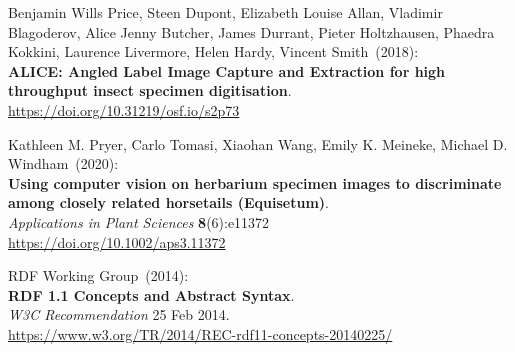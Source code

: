 \begin{thebibliography}{9}
Benjamin Wills Price, Steen Dupont, Elizabeth Louise Allan, Vladimir Blagoderov, Alice Jenny Butcher, James Durrant, Pieter Holtzhausen, Phaedra Kokkini, Laurence Livermore, Helen Hardy, Vincent Smith~(2018):\\
\textbf{ALICE: Angled Label Image Capture and Extraction
for high throughput insect specimen digitisation}.\\
\url{https://doi.org/10.31219/osf.io/s2p73}

Kathleen M. Pryer, Carlo Tomasi, Xiaohan Wang, Emily K. Meineke, Michael D. Windham~(2020):\\
\textbf{Using computer vision on herbarium specimen images
to discriminate among closely related horsetails (Equisetum)}.\\
\emph{Applications in Plant Sciences} \textbf{8}(6):e11372\\
\url{https://doi.org/10.1002/aps3.11372}

RDF Working Group~(2014):\\
\textbf{RDF 1.1 Concepts and Abstract Syntax}.\\
\emph{W3C Recommendation} 25 Feb 2014.\\
\url{https://www.w3.org/TR/2014/REC-rdf11-concepts-20140225/}


\end{thebibliography}
